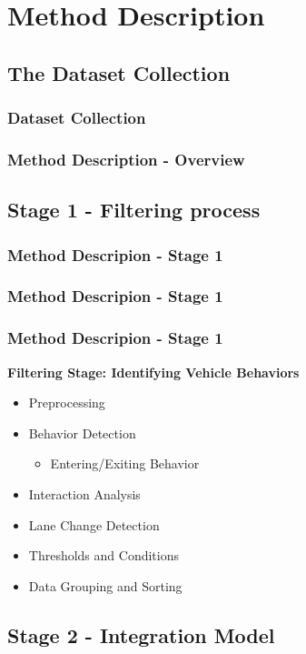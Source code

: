 
\section{Method Description}

\subsection{The Dataset Collection}
\begin{frame}
  \frametitle{Dataset Collection}
\end{frame}

\begin{frame}
  \frametitle{Method Description - Overview}
\end{frame}

\subsection{Stage 1 - Filtering process}

\begin{frame}
  \frametitle{Method Descripion - Stage 1}
\end{frame}

\begin{frame}
  \frametitle{Method Descripion - Stage 1}
\end{frame}

\begin{frame}
  \frametitle{Method Descripion - Stage 1}
\textbf{Filtering Stage: Identifying Vehicle Behaviors}
\begin{itemize}
    \item Preprocessing
    \item Behavior Detection
        \begin{itemize}
            \item Entering/Exiting Behavior
        \end{itemize}
    \item Interaction Analysis
    \item Lane Change Detection
    \item Thresholds and Conditions
    \item Data Grouping and Sorting
\end{itemize}

\end{frame}



\subsection{Stage 2 - Integration Model}

